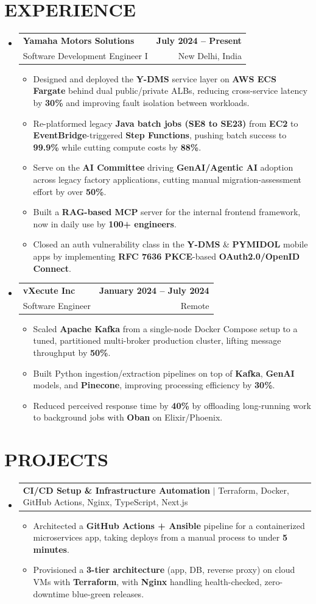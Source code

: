 \documentclass[letterpaper,10pt]{article}
\makeatletter
\renewcommand{\normalsize}{%
  \fontsize{10.1}{12.25}\selectfont
}
\newcommand{\resumeItem}[1]{
  \item\normalsize{
    {#1}
  }
}
\newcommand{\resumeSubheading}[4]{
  \item
    \begin{tabular*}{1.0\textwidth}[t]{l@{\extracolsep{\fill}}r}
      \textbf{\normalsize#1} & \textbf{\normalsize#2} \\
      {\normalsize#3} & {\normalsize#4} \\
    \end{tabular*}\vspace{1pt}
}
\newcommand{\resumeProjectHeading}[2]{
  \item
    \begin{tabular*}{1.0\textwidth}{l@{\extracolsep{\fill}}r}
      \normalsize#1 & \textbf{\normalsize#2}\\
    \end{tabular*}\vspace{2pt}
}
\newcommand{\resumeSubHeadingListStart}{\begin{itemize}[leftmargin=0.0in, label={}, itemsep=6pt, topsep=2pt]}
\newcommand{\resumeSubHeadingListEnd}{\end{itemize}}
\newcommand{\resumeItemListStart}{\begin{itemize}}
\newcommand{\resumeItemListEnd}{\end{itemize}\vspace{-3pt}}
\makeatother
\begin{document}
\section{EXPERIENCE}
  \resumeSubHeadingListStart

    \resumeSubheading
      {Yamaha Motors Solutions}{July 2024 -- Present}
      {Software Development Engineer I}{New Delhi, India}
      \resumeItemListStart
        \resumeItem{Designed and deployed the \textbf{Y-DMS} service layer on \textbf{AWS ECS Fargate} behind dual public/private ALBs, reducing cross-service latency by \textbf{30\%} and improving fault isolation between workloads.}
        \resumeItem{Re-platformed legacy \textbf{Java batch jobs (SE8 to SE23)} from \textbf{EC2} to \textbf{EventBridge}-triggered \textbf{Step Functions}, pushing batch success to \textbf{99.9\%} while cutting compute costs by \textbf{88\%}.}
        \resumeItem{Serve on the \textbf{AI Committee} driving \textbf{GenAI/Agentic AI} adoption across legacy factory applications, cutting manual migration-assessment effort by over \textbf{50\%}.}
        \resumeItem{Built a \textbf{RAG-based MCP} server for the internal frontend framework, now in daily use by \textbf{100+ engineers}.}
        \resumeItem{Closed an auth vulnerability class in the \textbf{Y-DMS} \& \textbf{PYMIDOL} mobile apps by implementing \textbf{RFC 7636 PKCE}-based \textbf{OAuth2.0/OpenID Connect}.}
      \resumeItemListEnd

    \resumeSubheading
      {vXecute Inc}{January 2024 -- July 2024}
      {Software Engineer}{Remote}
      \resumeItemListStart
        \resumeItem{Scaled \textbf{Apache Kafka} from a single-node Docker Compose setup to a tuned, partitioned multi-broker production cluster, lifting message throughput by \textbf{50\%}.}
        \resumeItem{Built Python ingestion/extraction pipelines on top of \textbf{Kafka}, \textbf{GenAI} models, and \textbf{Pinecone}, improving processing efficiency by \textbf{30\%}.}
        \resumeItem{Reduced perceived response time by \textbf{40\%} by offloading long-running work to background jobs with \textbf{Oban} on Elixir/Phoenix.}
      \resumeItemListEnd

  \resumeSubHeadingListEnd

\section{PROJECTS}
  \resumeSubHeadingListStart
    \resumeProjectHeading
      {\textbf{CI/CD Setup \& Infrastructure Automation} $|$ \textnormal{Terraform, Docker, GitHub Actions, Nginx, TypeScript, Next.js}}{}
      \resumeItemListStart
        \resumeItem{Architected a \textbf{GitHub Actions + Ansible} pipeline for a containerized microservices app, taking deploys from a manual process to under \textbf{5 minutes}.}
        \resumeItem{Provisioned a \textbf{3-tier architecture} (app, DB, reverse proxy) on cloud VMs with \textbf{Terraform}, with \textbf{Nginx} handling health-checked, zero-downtime blue-green releases.}
      \resumeItemListEnd
  \resumeSubHeadingListEnd
\end{document}
